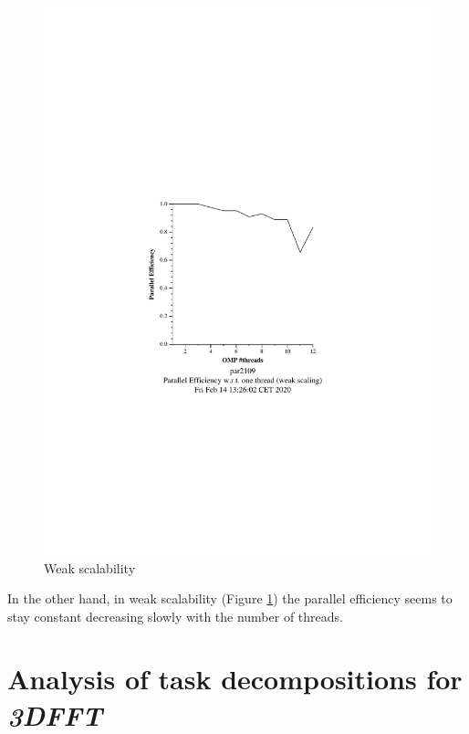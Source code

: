\begin{figure}[H]%
    \caption{Weak scalability}%
    \label{fig:weak}
    \centering
    \includegraphics[width=\textwidth]{./data/pi/pi_omp-100000000-1-12-3-weak-boada-3.pdf}
\end{figure}

In the other hand, in weak scalability (Figure \ref{fig:weak}) the parallel efficiency seems to stay constant decreasing slowly with the number of threads.




\section{Analysis of task decompositions for \emph{3DFFT}}%
\label{sec:analysis_of_task_decompositions_for_3dfft}

